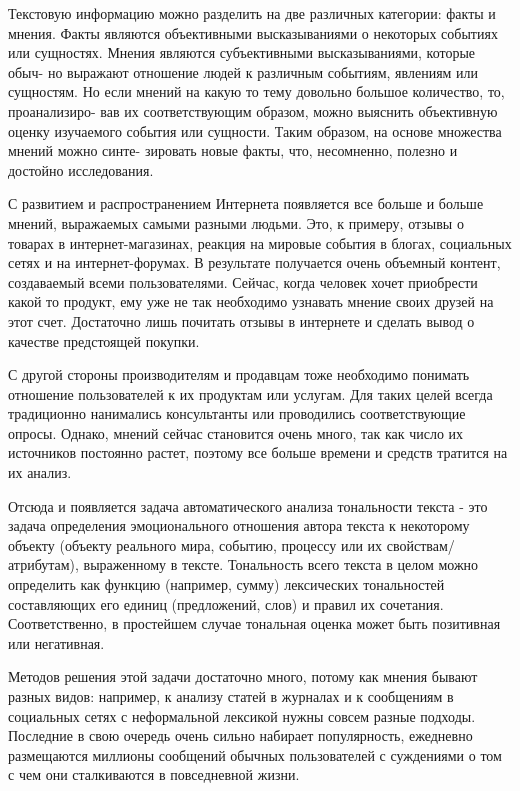 \startprefacepage

Текстовую информацию можно разделить на две различных категории: факты
и мнения. Факты являются объективными высказываниями о некоторых событиях
или сущностях. Мнения являются субъективными высказываниями, которые обыч-
но выражают отношение людей к различным событиям, явлениям или сущностям.
Но если мнений на какую то тему довольно большое количество, то, проанализиро-
вав их соответствующим образом, можно выяснить объективную оценку изучаемого
события или сущности. Таким образом, на основе множества мнений можно синте-
зировать новые факты, что, несомненно, полезно и достойно исследования.

С развитием и распространением Интернета появляется все больше и больше
мнений, выражаемых самыми разными людьми. Это, к примеру, отзывы о товарах в
интернет-магазинах, реакция на мировые события в блогах, социальных сетях и на
интернет-форумах. В результате получается очень объемный контент, создаваемый
всеми пользователями. Сейчас, когда человек хочет приобрести какой то продукт,
ему уже не так необходимо узнавать мнение своих друзей на этот счет. Достаточно
лишь почитать отзывы в интернете и сделать вывод о качестве предстоящей покупки.

С другой стороны производителям и продавцам тоже необходимо понимать отношение
пользователей к их продуктам или услугам. Для таких целей всегда традиционно
нанимались консультанты или проводились соответствующие опросы. Однако, мнений
сейчас становится очень много, так как число их источников постоянно
растет, поэтому все больше времени и средств тратится на их анализ.

Отсюда и появляется задача автоматического анализа тональности текста - это
задача определения эмоционального отношения автора текста к некоторому объекту
(объекту реального мира, событию, процессу или их свойствам/атрибутам),
выраженному в тексте. Тональность всего текста в целом можно определить как
функцию (например, сумму) лексических тональностей составляющих его единиц
(предложений, слов) и правил их сочетания. Соответственно, в простейшем случае
тональная оценка может быть позитивная или негативная.

Методов решения этой задачи достаточно много, потому как мнения бывают
разных видов: например, к анализу статей в журналах и к сообщениям в социальных
сетях с неформальной лексикой нужны совсем разные подходы. Последние в свою
очередь очень сильно набирает популярность, ежедневно размещаются миллионы
сообщений обычных пользователей с суждениями о том с чем они сталкиваются в
повседневной жизни.

